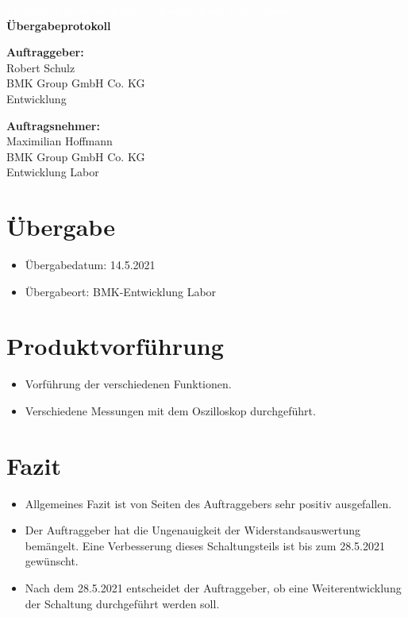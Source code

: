\documentclass[a4paper,11pt]{scrartcl}
\begin{document}
\begin{center}
	\begin{huge}
	\textcolor{white}{\tiny{Platzhalter wenn ein Kapitel auf einer neuen Seite beginnt\\}}
	\textbf{Übergabeprotokoll}
	\end{huge}
\end{center}

\textbf{Auftraggeber:}\\
Robert Schulz\\
BMK Group GmbH Co. KG\\
Entwicklung \\

\vspace{0,5cm}

\textbf{Auftragsnehmer:}\\
Maximilian Hoffmann\\
BMK Group GmbH Co. KG\\
Entwicklung Labor

\section{Übergabe}

\begin{itemize}
	\item{Übergabedatum: 14.5.2021}
	
	\item{Übergabeort: BMK-Entwicklung Labor}
\end{itemize}

\section{Produktvorführung}

\begin{itemize}
	\item{Vorführung der verschiedenen Funktionen.}
	
	\item{Verschiedene Messungen mit dem Oszilloskop durchgeführt.}
\end{itemize}

\section{Fazit}

\begin{itemize}
	\item{Allgemeines Fazit ist von Seiten des Auftraggebers sehr positiv ausgefallen.}
	
	\item{Der Auftraggeber hat die Ungenauigkeit der Widerstandsauswertung bemängelt. Eine Verbesserung dieses Schaltungsteils ist bis zum 28.5.2021 gewünscht.}
	
	\item{Nach dem 28.5.2021 entscheidet der Auftraggeber, ob eine Weiterentwicklung der Schaltung durchgeführt werden soll.}
\end{itemize}
\end{document}
